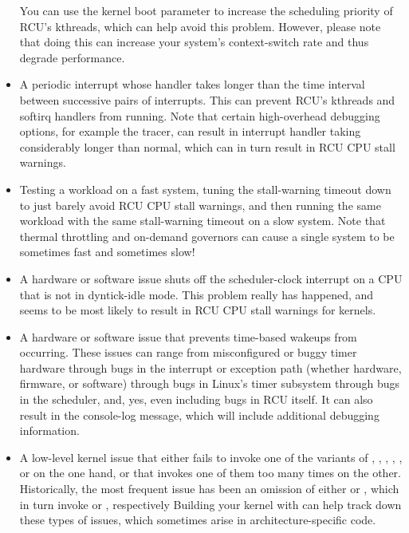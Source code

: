 \begin{itemize}
	You can use the  kernel boot parameter to
	increase the scheduling priority of RCU's kthreads, which can
	help avoid this problem.
	However, please note that doing this
	can increase your system's context-switch rate and thus degrade
	performance.

\item	A periodic interrupt whose handler takes longer than the time
	interval between successive pairs of interrupts.
	This can
	prevent RCU's kthreads and softirq handlers from running.
	Note that certain high-overhead debugging options, for example
	the  tracer, can result in interrupt handler taking
	considerably longer than normal, which can in turn result in
	RCU CPU stall warnings.

\item	Testing a workload on a fast system, tuning the stall-warning
	timeout down to just barely avoid RCU CPU stall warnings, and then
	running the same workload with the same stall-warning timeout on a
	slow system.
	Note that thermal throttling and on-demand governors
	can cause a single system to be sometimes fast and sometimes slow!

\item	A hardware or software issue shuts off the scheduler-clock
	interrupt on a CPU that is not in dyntick-idle mode.
	This
	problem really has happened, and seems to be most likely to
	result in RCU CPU stall warnings for  kernels.

\item	A hardware or software issue that prevents time-based wakeups
	from occurring.
	These issues can range from misconfigured or
	buggy timer hardware through bugs in the interrupt or exception
	path (whether hardware, firmware, or software) through bugs
	in Linux's timer subsystem through bugs in the scheduler, and,
	yes, even including bugs in RCU itself.
	It can also result in
	the  console-log message,
	which will include additional debugging information.

\item	A low-level kernel issue that either fails to invoke one of the
	variants of , , ,
	, , or  on the one
	hand, or that invokes one of them too many times on the other.
	Historically, the most frequent issue has been an omission
	of either  or , which in turn invoke
	 or , respectively
	Building your
	kernel with  can help track down these types
	of issues, which sometimes arise in architecture-specific code.


\end{itemize}
